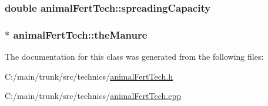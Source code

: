\label{classanimal_fert_tech_a146f70bdb7472097e215faba9936396f}
\hypertarget{classanimal_fert_tech_a3efcf646ccd9fa24f059889de001a400}{
\subsubsection[{spreadingCapacity}]{\setlength{\rightskip}{0pt plus 5cm}double {\bf animalFertTech::spreadingCapacity}}}
\label{classanimal_fert_tech_a3efcf646ccd9fa24f059889de001a400}
\hypertarget{classanimal_fert_tech_ac0b8fa8db716140c87f147dbd65bca53}{
\subsubsection[{theManure}]{$\ast$ {\bf animalFertTech::theManure}}}
\label{classanimal_fert_tech_ac0b8fa8db716140c87f147dbd65bca53}


The documentation for this class was generated from the following files:\begin{DoxyCompactItemize}
\item 
C:/main/trunk/src/technics/\hyperlink{animal_fert_tech_8h}{animalFertTech.h}\item 
C:/main/trunk/src/technics/\hyperlink{animal_fert_tech_8cpp}{animalFertTech.cpp}\end{DoxyCompactItemize}
